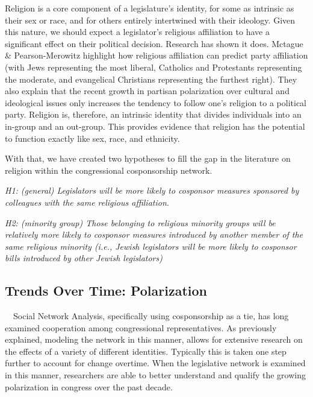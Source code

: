 \documentclass[Royal,times,sageh]{sagej}
\begin{document}
Religion is a core component of a legislature's identity, for some as
intrinsic as their sex or race, and for others entirely intertwined with
their ideology. Given this nature, we should expect a legislator's
religious affiliation to have a significant effect on their political
decision. Research has shown it does. Mctague \& Pearson-Merowitz
\citeyearpar{mctague} highlight how religious affiliation can predict
party affiliation (with Jews representing the most liberal, Catholics
and Protestants representing the moderate, and evangelical Christians
representing the furthest right). They also explain that the recent
growth in partisan polarization over cultural and ideological issues
only increases the tendency to follow one's religion to a political
party. Religion is, therefore, an intrinsic identity that divides
individuals into an in-group and an out-group. This provides evidence
that religion has the potential to function exactly like sex, race, and
ethnicity.

With that, we have created two hypotheses to fill the gap in the
literature on religion within the congressional cosponsorship network.

\emph{H1: (general) Legislators will be more likely to cosponsor
measures sponsored by colleagues with the same religious affiliation.}

\emph{H2: (minority group) Those belonging to religious minority groups
will be relatively more likely to cosponsor measures introduced by
another member of the same religious minority (i.e., Jewish legislators
will be more likely to cosponsor bills introduced by other Jewish
legislators)}

\hypertarget{trends-over-time-polarization}{%
\subsection{Trends Over Time:
Polarization}\label{trends-over-time-polarization}}

~~Social Network Analysis, specifically using cosponsorship as a tie,
has long examined cooperation among congressional representatives. As
previously explained, modeling the network in this manner, allows for
extensive research on the effects of a variety of different identities.
Typically this is taken one step further to account for change overtime.
When the legislative network is examined in this manner, researchers are
able to better understand and qualify the growing polarization in
congress over the past decade.
\end{document}
